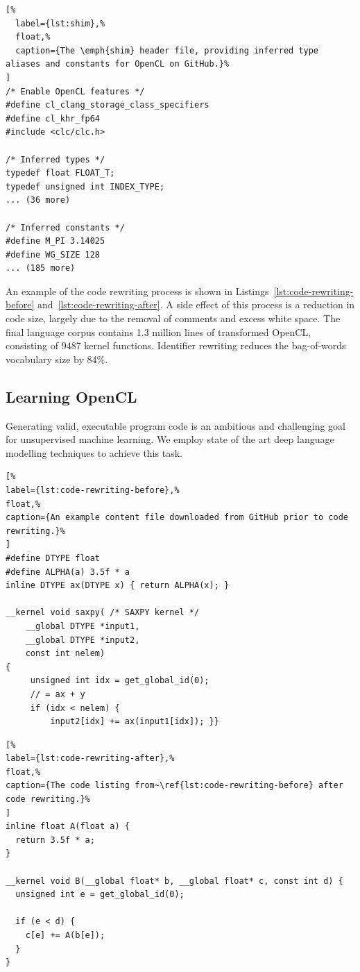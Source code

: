 \lstset{language=C}
\begin{lstlisting}[%
  label={lst:shim},%
  float,%
  caption={The \emph{shim} header file, providing inferred type aliases and constants for OpenCL on GitHub.}%
]
/* Enable OpenCL features */
#define cl_clang_storage_class_specifiers
#define cl_khr_fp64
#include <clc/clc.h>

/* Inferred types */
typedef float FLOAT_T;
typedef unsigned int INDEX_TYPE;
... (36 more)

/* Inferred constants */
#define M_PI 3.14025
#define WG_SIZE 128
... (185 more)
\end{lstlisting}

\noindent %
An example of the code rewriting process is shown in Listings~\ref{lst:code-rewriting-before} and~\ref{lst:code-rewriting-after}. A side effect of this process is a reduction in code size, largely due to the removal of comments and excess white space. The final language corpus contains 1.3 million lines of transformed OpenCL, consisting of 9487 kernel functions. Identifier rewriting reduces the bag-of-words vocabulary size by 84\%.

\subsection{Learning OpenCL}\label{sec:ml}

Generating valid, executable program code is an ambitious and challenging goal for unsupervised machine learning. We employ state of the art deep language modelling techniques to achieve this task.

\lstset{language=[OpenCL]C}
\begin{lstlisting}[%
label={lst:code-rewriting-before},%
float,%
caption={An example content file downloaded from GitHub prior to code rewriting.}%
]
#define DTYPE float
#define ALPHA(a) 3.5f * a
inline DTYPE ax(DTYPE x) { return ALPHA(x); }

__kernel void saxpy( /* SAXPY kernel */
    __global DTYPE *input1,
    __global DTYPE *input2,
    const int nelem)
{
     unsigned int idx = get_global_id(0);
     // = ax + y
     if (idx < nelem) {
         input2[idx] += ax(input1[idx]); }}
\end{lstlisting}

\lstset{language=[OpenCL]C}
\begin{lstlisting}[%
label={lst:code-rewriting-after},%
float,%
caption={The code listing from~\ref{lst:code-rewriting-before} after code rewriting.}%
]
inline float A(float a) {
  return 3.5f * a;
}

__kernel void B(__global float* b, __global float* c, const int d) {
  unsigned int e = get_global_id(0);

  if (e < d) {
    c[e] += A(b[e]);
  }
}
\end{lstlisting}

